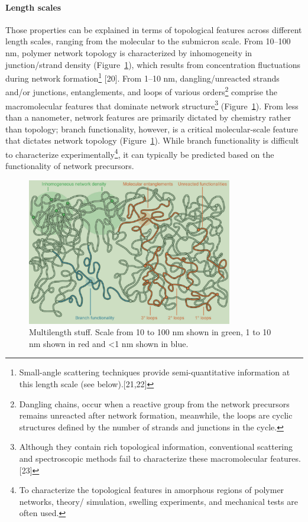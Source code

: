 \paragraph{Length scales} Those properties can be explained in terms of topological features across different length scales, ranging from the molecular to the submicron scale.
From 10–100 nm, polymer network topology is characterized by inhomogeneity in junction/strand density (Figure~\ref{fig:lengthScales}), which results from concentration fluctuations during network formation\footnote{Small-angle scattering techniques provide semi-quantitative information at this length scale (see below).[21,22]} [20].
From 1–10 nm, dangling/unreacted strands and/or junctions, entanglements, and loops of various orders\footnote{Dangling chains, occur when a reactive group from the network precursors remains unreacted after network formation, meanwhile, the loops are cyclic structures defined by the number of strands and junctions in the cycle. 
} comprise the macromolecular features that dominate network structure\footnote{Although they contain rich topological information, conventional scattering and spectroscopic methods fail to characterize these macromolecular features.[23]} (Figure~\ref{fig:lengthScales}). 
From less than a nanometer, network features are primarily dictated by chemistry rather than topology; branch functionality, however, is a critical molecular-scale feature that dictates network topology (Figure~\ref{fig:lengthScales}). 
While branch functionality is difficult to characterize experimentally\footnote{To characterize the topological features in amorphous regions of polymer networks, theory/ simulation, swelling experiments, and mechanical tests are often used.}, it can typically be predicted based on the functionality of network precursors\citep{guPolymerNetworksPlastics2020}.

\begin{figure}[ht!]
    \centering
    \includegraphics[width=0.8\textwidth]{figs/multilengthTopology.png}
    \caption{Multilength stuff. Scale from 10 to 100 nm shown in green, 1 to 10 nm shown in red and <1 nm shown in blue. }\label{fig:lengthScales}
\end{figure}

